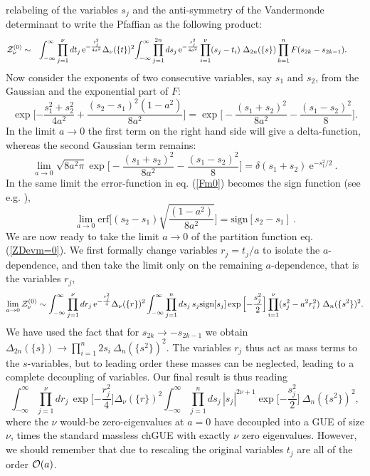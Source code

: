 \documentclass[11pt]{article}
\newcommand{\be}{\begin{equation}}
\newcommand{\ee}{\end{equation}}
\newcommand{\bea}{\begin{eqnarray}}
\newcommand{\eea}{\end{eqnarray}}
\newcommand{\e}{\mbox{e}}
\newcommand{\erf}{\mbox{erf}}
\newcommand{\sign}{\mbox{sign}}
\begin{document}
\begin{appendix}
relabeling of the 
variables $s_j$ and the anti-symmetry of the Vandermonde determinant
to write the Pfaffian as the following product: 
\bea
{\cal Z}_\nu^{(0)} &\sim&
\int_{-\infty}^\infty\prod_{j=1}^{\nu}
dt_j\,\e^{-\frac{t_j^2}{4a^2}}
\Delta_{\nu}(\{t\})^2\!
\int_{-\infty}^\infty\prod_{j=1}^{2n}
ds_j\,\e^{-\frac{s_j^2}{4a^2}}\prod_{i=1}^{\nu}(s_j-t_i)
\ \Delta_{2n}(\{s\})
\prod_{k=1}^n F(s_{2k}-s_{2k-1}).\ \ \ \ \ \ 
\label{ZDevm=0}
\eea
Now consider the exponents of two consecutive variables, say $s_1$ and
$s_2$, from the Gaussian and the exponential part of $F$: 
\be
\exp\Big[{-\frac{s_1^2+s_2^2}{4a^2}}+
\frac{(s_{2}-s_{1})^2(1-a^2)}{8a^2}\Big]
=\exp\Big[-\frac{(s_1+s_2)^2}{8a^2}-\frac{(s_1-s_2)^2}{8}\Big].
\ee
In the limit $a\to0$ the first term on the right hand side will give a
delta-function, whereas the second Gaussian term remains:
\be
\lim_{a\to0}\sqrt{8a^2\pi}\exp\Big[-\frac{(s_1+s_2)^2}{8a^2}
-\frac{(s_1-s_2)^2}{8}\Big] = \delta(s_1+s_2)\ \e^{-s_1^2/2}\ .
\ee
In the same limit the error-function in eq. (\ref{Fm0}) becomes the
sign function (see e.g. \cite{PandeyMehta}), 
\be
\lim_{a\to0}\erf\Big[ (s_2-s_1)
\sqrt{\frac{(1-a^2)}{8a^2}}\Big]=\sign[s_2-s_1]\ .
\label{limerf}
\ee
We are now ready to take the limit $a\to0$ of the partition function
eq. (\ref{ZDevm=0}). We first formally
change variables $r_j=t_j/a$ %
to isolate the $a$-dependence, and then
take the limit only on the remaining $a$-dependence, that is the
variables $r_j$, 
\be
\lim_{a\to0}{\cal Z}_\nu^{(0)}
\sim\int_{-\infty}^\infty \prod_{j=1}^{\nu} dr_j \, 
\e^{-\frac{r_j^2}{4}}\Delta_{\nu}(\{ r \})^2 
\int_{-\infty}^\infty\prod_{j=1}^{n} ds_j \, 
s_j \sign[s_j] \exp\Big[{-\frac{s_j^2}{2}}\Big]
\prod_{i=1}^{\nu}(s_j^2 - a^2 r_i^2) \ 
\Delta_{n}(\{s^2\})^2.
\label{ZDeva0}
\ee
We have used the fact that for $s_{2k} \to - s_{2k-1}$ we obtain 
$\Delta_{2n}(\{s\}) \to \prod_{i=1}^n 2 s_i \ \Delta_n(\{s^2\})^2$.
The variables $r_j$ thus act as mass terms to the $s$-variables, 
but to leading order these masses can be neglected, leading to 
a complete decoupling of variables.
Our final result is thus reading
\be
\int_{-\infty}^\infty\prod_{j=1}^{\nu} dr_j \, 
\exp\Big[{-\frac{r_j^2}{4}}\Big]
\Delta_{\nu}(\{r\})^2
\int_{-\infty}^\infty\prod_{j=1}^{n}
ds_j\,|s_j|^{2\nu+1}\exp\Big[{-\frac{s_j^2}{2}}\Big]
\ \Delta_{n}(\{s^2\})^2,
\label{Zfactor}
\ee
where the $\nu$ would-be zero-eigenvalues at $a=0$ have decoupled into
a GUE of size $\nu$, 
times the standard massless chGUE with exactly $\nu$ zero eigenvalues.
However, we should remember that due to rescaling
the original variables $t_j$ are all of the order ${\cal O}(a)$.


\end{appendix}
\end{document}
